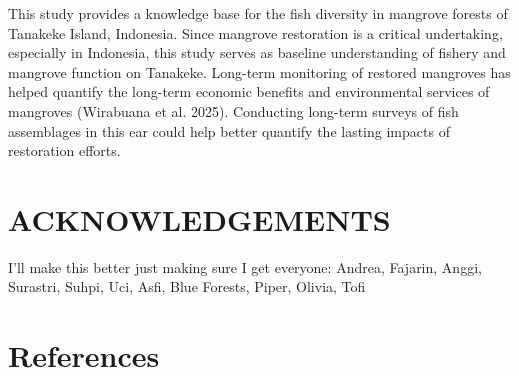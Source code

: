 \documentclass[
]{article}
\begin{document}
This study provides a knowledge base for the fish diversity in mangrove forests of Tanakeke Island, Indonesia. Since mangrove restoration is a critical undertaking, especially in Indonesia, this study serves as baseline understanding of fishery and mangrove function on Tanakeke. Long-term monitoring of restored mangroves has helped quantify the long-term economic benefits and environmental services of mangroves (Wirabuana et al. 2025). Conducting long-term surveys of fish assemblages in this ear could help better quantify the lasting impacts of restoration efforts.

\section{ACKNOWLEDGEMENTS}\label{acknowledgements}

I'll make this better just making sure I get everyone: Andrea, Fajarin, Anggi, Surastri, Suhpi, Uci, Asfi, Blue Forests, Piper, Olivia, Tofi

\newpage

\section*{References}\label{references}
\end{document}
